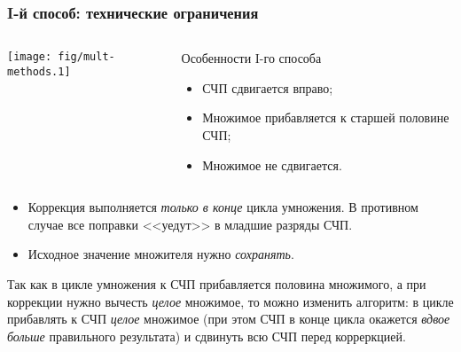 \begin{frame}
    \frametitle{I-й способ: технические ограничения}
    
    \begin{columns}
            \begin{block}{}
                \texttt{[image: fig/mult-methods.1]}            
            \end{block}
            \begin{block}{Особенности I-го способа}
                \begin{itemize}
                    \item СЧП сдвигается вправо; 
                    \item Множимое прибавляется к старшей половине СЧП;
                    \item Множимое не сдвигается.
                \end{itemize}
            \end{block}
    \end{columns}
    
    \begin{itemize}
        \item Коррекция выполняется \emph{только в конце} цикла умножения. В противном случае все поправки <<уедут>> в младшие разряды СЧП.
        \item Исходное значение множителя нужно \emph{сохранять}.
    \end{itemize}
    Так как в цикле умножения к СЧП прибавляется половина множимого, а при коррекции нужно вычесть \emph{целое} множимое, то можно изменить алгоритм: в цикле прибавлять к СЧП \emph{целое} множимое (при этом СЧП в конце цикла окажется \emph{вдвое больше} правильного результата) и сдвинуть всю СЧП перед корреркцией.
\end{frame}    

